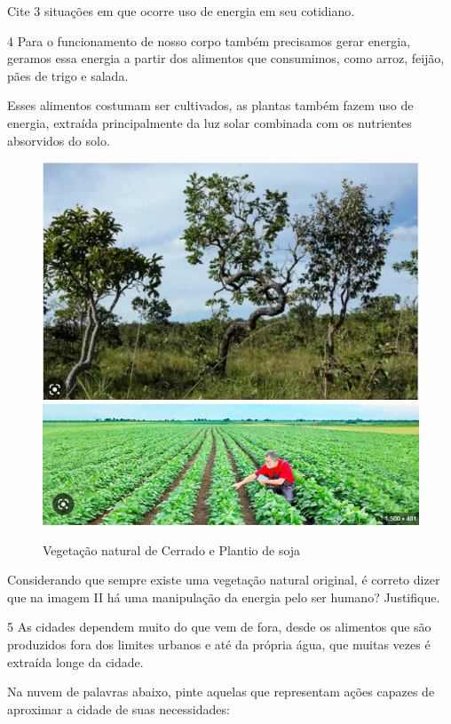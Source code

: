 Cite 3 situações em que ocorre uso de energia em seu cotidiano.



\num{4} Para o funcionamento de nosso corpo também precisamos gerar energia,
geramos essa energia a partir dos alimentos que consumimos, como arroz,
feijão, pães de trigo e salada.

Esses alimentos costumam ser cultivados, as plantas também fazem uso de
energia, extraída principalmente da luz solar combinada com os
nutrientes absorvidos do solo.

\begin{figure}[htpb!]
\includegraphics[width=.5\textwidth]{./imgs/img6.jpg}
\includegraphics[width=.5\textwidth]{./imgs/img7.jpg}
\caption{Vegetação natural de Cerrado e Plantio de soja}
\end{figure}

Considerando que sempre existe uma vegetação natural original, é correto
dizer que na imagem II há uma manipulação da energia pelo ser humano?
Justifique.



\num{5} As cidades dependem muito do que vem de fora, desde os alimentos que
são produzidos fora dos limites urbanos e até da própria água, que
muitas vezes é extraída longe da cidade.

Na nuvem de palavras abaixo, pinte aquelas que representam ações capazes
de aproximar a cidade de suas necessidades:

